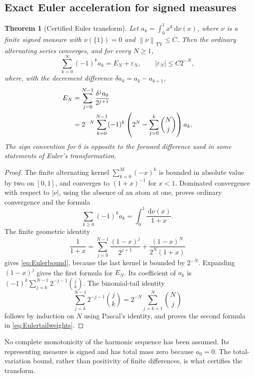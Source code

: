 \documentclass[11pt,letterpaper]{article}
\numberwithin{equation}{section}
\newtheorem{theorem}{Theorem}[section]
\theoremstyle{definition}
\DeclareMathOperator{\TV}{TV}
\newcommand{\dd}{\,\mathrm d}
\newcommand{\eps}{\varepsilon}
\newcommand{\norm}[1]{\left\lVert#1\right\rVert}
\begin{document}
\subsection{Exact Euler acceleration for signed measures}
\begin{theorem}[Certified Euler transform]\label{thm:Euler}
Let $a_k=\int_0^1x^k\dd\nu(x)$, where $\nu$ is a finite signed measure
with $\nu(\{1\})=0$ and $\norm\nu_{\TV}\le C$. Then the ordinary
alternating series converges, and for every $N\ge1$,
\begin{equation}
 \sum_{k=0}^{\infty}(-1)^ka_k=E_N+\eps_N,
 \qquad |\eps_N|\le C2^{-N},
 \label{eq:Eulerbound}
\end{equation}
where, with the decrement difference $\delta a_k=a_k-a_{k+1}$,
\begin{align}
 E_N&=\sum_{j=0}^{N-1}\frac{\delta^ja_0}{2^{j+1}}\notag\\
 &=2^{-N}\sum_{k=0}^{N-1}(-1)^k
       \left(2^N-\sum_{j=0}^k\binom Nj\right)a_k.
 \label{eq:Eulertailweights}
\end{align}
The sign convention for $\delta$ is opposite to the forward difference
used in some statements of Euler's transformation.
\end{theorem}
\begin{proof}
The finite alternating kernel $\sum_{k=0}^M(-x)^k$ is bounded in
absolute value by two on $[0,1]$, and converges to $(1+x)^{-1}$ for
$x<1$. Dominated convergence with respect to $|\nu|$, using the
absence of an atom at one, proves ordinary convergence and the formula
\[
 \sum_{k\ge0}(-1)^ka_k=\int_0^1\frac{\dd\nu(x)}{1+x}.
\]
The finite geometric identity
\begin{equation}
 \frac1{1+x}=\sum_{j=0}^{N-1}\frac{(1-x)^j}{2^{j+1}}
      +\frac{(1-x)^N}{2^N(1+x)}
 \label{eq:kernelEuler}
\end{equation}
gives \eqref{eq:Eulerbound}, because the last kernel is bounded by
$2^{-N}$. Expanding $(1-x)^j$ gives the first formula for $E_N$.
Its coefficient of $a_k$ is
$(-1)^k\sum_{j=k}^{N-1}2^{-j-1}\binom jk$.
The binomial-tail identity
\[
 \sum_{j=k}^{N-1}2^{-j-1}\binom jk
   =2^{-N}\sum_{j=k+1}^{N}\binom Nj
\]
follows by induction on $N$ using Pascal's identity, and proves the
second formula in \eqref{eq:Eulertailweights}.
\end{proof}

No complete monotonicity of the harmonic sequence has been assumed.
Its representing measure is signed and has total mass zero because
$a_0=0$. The total-variation bound, rather than positivity of finite
differences, is what certifies the transform.
\end{document}
